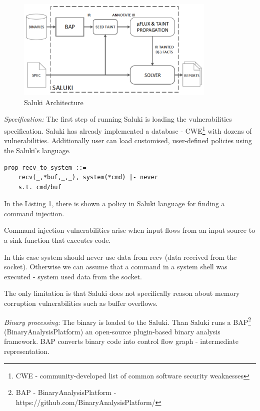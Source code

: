 \documentclass[a4paper, 12pt, journal, onecolumn]{IEEEtran}
\begin{document}
\begin{figure}[ht]
    \centering
    \captionsetup{justification=centering}
    \includegraphics[width=0.85\textwidth]{saluki.png}
    \caption{Saluki Architecture \cite{saluki}}
    \label{fig:saluki}
\end{figure}

\textit{Specification: } The first step of running Saluki is loading the vulnerabilities specification. Saluki has already implemented a database - CWE\footnote{CWE - community-developed list of common software security weaknesses} with dozens of vulnerabilities. Additionally user can load customised, user-defined policies using the Saluki's language.\\


\begin{lstlisting}[label=saluki-code,caption=Command injection example]
    prop recv_to_system ::=
    recv(_,*buf,_,_), system(*cmd) |- never
    s.t. cmd/buf
\end{lstlisting}

In the Listing 1, there is shown a policy in Saluki language for finding a command injection. 

Command injection vulnerabilities arise when input flows from an input source to a sink function that executes code. 

In this case system should never use data from recv (data received from the socket). Otherwise we can assume that a command in a system shell was executed - system used data from the socket. 

The only limitation is that Saluki does not specifically reason about memory corruption vulnerabilities such as buffer overflows.
\bigskip

\textit{Binary processing:} The binary is loaded to the Saluki. Than Saluki runs a BAP\footnote{BAP - BinaryAnalysisPlatform - https://github.com/BinaryAnalysisPlatform/} (BinaryAnalysisPlatform) an open-source plugin-based binary analysis framework. BAP converts binary code into control flow graph - intermediate representation.\cite{a8} 
\\
\end{document}
